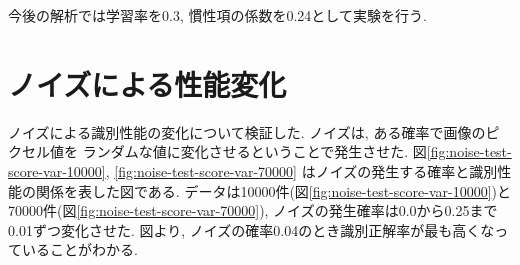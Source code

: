 \documentclass[10pt]{jarticle}
\begin{document}
今後の解析では学習率を0.3, 慣性項の係数を0.24として実験を行う.

\section{ノイズによる性能変化}
ノイズによる識別性能の変化について検証した. 
ノイズは, ある確率で画像のピクセル値を
ランダムな値に変化させるということで発生させた. 
図\ref{fig:noise-test-score-var-10000}, 
\ref{fig:noise-test-score-var-70000}
はノイズの発生する確率と識別性能の関係を表した図である. 
データは10000件(図\ref{fig:noise-test-score-var-10000})と
70000件(図\ref{fig:noise-test-score-var-70000}), 
ノイズの発生確率は0.0から0.25まで0.01ずつ変化させた. 
図より, ノイズの確率0.04のとき識別正解率が最も高くなっていることがわかる. 
\end{document}
